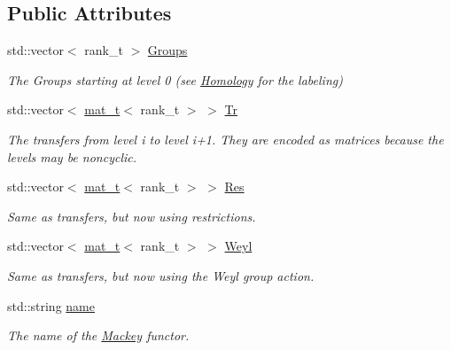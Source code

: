 \subsection*{Public Attributes}
\begin{DoxyCompactItemize}
\item 
std\+::vector$<$ rank\+\_\+t $>$ \hyperlink{classMackey_1_1MackeyFunctor_a4f8f5f7ac6267bdee2a67c8874bdd9a3}{Groups}
\begin{DoxyCompactList}\small\item\em The Groups starting at level 0 (see \hyperlink{classMackey_1_1Homology}{Homology} for the labeling) \end{DoxyCompactList}\item 
std\+::vector$<$ \hyperlink{namespaceMackey_a035386035757dade630f685e508e5cf9}{mat\+\_\+t}$<$ rank\+\_\+t $>$ $>$ \hyperlink{classMackey_1_1MackeyFunctor_aeb319977f08791ff220d647cbf460c6c}{Tr}
\begin{DoxyCompactList}\small\item\em The transfers from level i to level i+1. They are encoded as matrices because the levels may be noncyclic. \end{DoxyCompactList}\item 
std\+::vector$<$ \hyperlink{namespaceMackey_a035386035757dade630f685e508e5cf9}{mat\+\_\+t}$<$ rank\+\_\+t $>$ $>$ \hyperlink{classMackey_1_1MackeyFunctor_aa017d427a7ca062c2fe974c3930de6d8}{Res}
\begin{DoxyCompactList}\small\item\em Same as transfers, but now using restrictions. \end{DoxyCompactList}\item 
std\+::vector$<$ \hyperlink{namespaceMackey_a035386035757dade630f685e508e5cf9}{mat\+\_\+t}$<$ rank\+\_\+t $>$ $>$ \hyperlink{classMackey_1_1MackeyFunctor_a22162c7320c3793b5cdaad62b063d057}{Weyl}
\begin{DoxyCompactList}\small\item\em Same as transfers, but now using the Weyl group action. \end{DoxyCompactList}\item 
std\+::string \hyperlink{classMackey_1_1MackeyFunctor_ae1d69a215249d8b1018ac810ecc63d56}{name}
\begin{DoxyCompactList}\small\item\em The name of the \hyperlink{namespaceMackey}{Mackey} functor. \end{DoxyCompactList}\end{DoxyCompactItemize}


